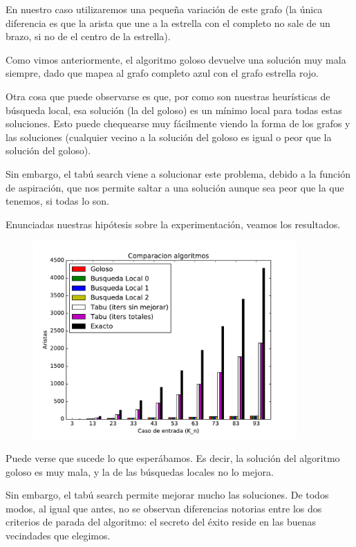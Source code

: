 En nuestro caso utilizaremos una pequeña variación de este grafo (la única diferencia es que la arista que une a la estrella con el completo no sale de un brazo, si no de el centro de la estrella).

Como vimos anteriormente, el algoritmo goloso devuelve una solución muy mala siempre, dado que mapea al grafo completo azul con el grafo estrella rojo. 

Otra cosa que puede observarse es que, por como son nuestras heurísticas de búsqueda local, esa solución (la del goloso) es un mínimo local para todas estas soluciones. Esto puede chequearse muy fácilmente viendo la forma de los grafos y las soluciones (cualquier vecino a la solución del goloso es igual o peor que la solución del goloso).

Sin embargo, el tabú search viene a solucionar este problema, debido a la función de aspiración, que nos permite saltar a una solución aunque sea peor que la que tenemos, si todas lo son.

Enunciadas nuestras hipótesis sobre la experimentación, veamos los resultados.

\begin{figure}[H]
 \centering
	\includegraphics[width=0.9\textwidth]{graficos/problema_7/exacto0.pdf}
	\caption{}
	\label{fig:problema7-exacto0}
\end{figure}


Puede verse que sucede lo que esperábamos. Es decir, la solución del algoritmo goloso es muy mala, y la de las búsquedas locales no lo mejora.

Sin embargo, el tabú search permite mejorar mucho las soluciones. De todos modos, al igual que antes, no se observan diferencias notorias entre los dos criterios de parada del algoritmo: el secreto del éxito reside en las buenas vecindades que elegimos.



